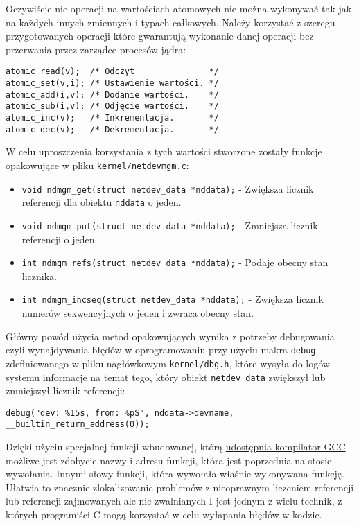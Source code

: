 \documentclass[10pt]{article}
\begin{document}
Oczywiście nie operacji na wartościach atomowych nie można wykonywać tak
jak na każdych innych zmiennych i typach całkowych. Należy korzystać z
szeregu przygotowanych operacji które gwarantują wykonanie danej
operacji bez przerwania przez zarządce procesów jądra:

\begin{verbatim}
atomic_read(v);  /* Odczyt               */
atomic_set(v,i); /* Ustawienie wartości. */
atomic_add(i,v); /* Dodanie wartości.    */
atomic_sub(i,v); /* Odjęcie wartości.    */
atomic_inc(v);   /* Inkrementacja.       */
atomic_dec(v);   /* Dekrementacja.       */
\end{verbatim}

W celu uproszczenia korzystania z tych wartości stworzone zostały
funkcje opakowujące w pliku \texttt{kernel/netdevmgm.c}:

\begin{itemize}
\itemsep1pt\parskip0pt
\item
  \texttt{void ndmgm\_get(struct netdev\_data *nddata);} - Zwiększa
  licznik referencji dla obiektu \texttt{nddata} o jeden.
\item
  \texttt{void ndmgm\_put(struct netdev\_data *nddata);} - Zmniejsza
  licznik referencji o jeden.
\item
  \texttt{int ndmgm\_refs(struct netdev\_data *nddata);} - Podaje obecny
  stan licznika.
\item
  \texttt{int ndmgm\_incseq(struct netdev\_data *nddata);} - Zwiększa
  licznik numerów sekwencyjnych o jeden i zwraca obecny stan.
\end{itemize}

Główny powód użycia metod opakowujących wynika z potrzeby debugowania
czyli wynajdywania błędów w oprogramowaniu przy użyciu makra
\texttt{debug} zdefiniowanego w pliku nagłówkowym \texttt{kernel/dbg.h},
które wysyła do logów systemu informacje na temat tego, który obiekt
\texttt{netdev\_data} zwiększył lub zmniejszył licznik referencji:

\begin{verbatim}
debug("dev: %15s, from: %pS", nddata->devname, __builtin_return_address(0));
\end{verbatim}

Dzięki użyciu specjalnej funkcji wbudowanej, którą
\href{http://gcc.gnu.org/onlinedocs/gcc/Return-Address.html}{udostępnia
kompilator GCC} możliwe jest zdobycie nazwy i adresu funkcji, która jest
poprzednia na stosie wywołania. Innymi słowy funkcji, która wywołała
właśnie wykonywana funkcję. Ułatwia to znacznie zlokalizowanie problemów
z nieoprawnym liczeniem referencji lub referencji zajmowanych ale nie
zwalnianych I jest jednym z wielu technik, z których programiści C mogą
korzystać w celu wyłapania błędów w kodzie.
\end{document}
